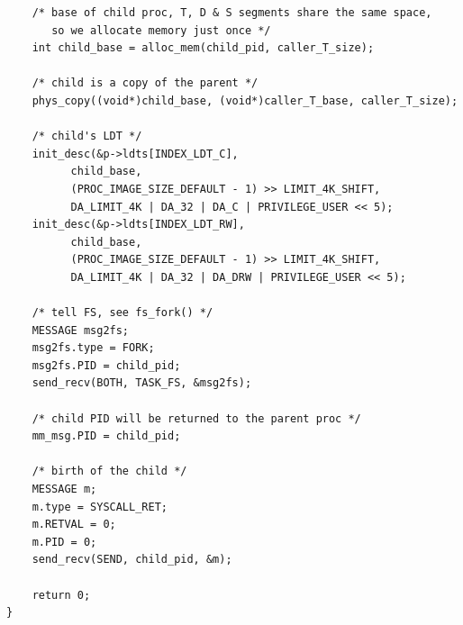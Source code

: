 \documentclass[UTF8,nofonts,cs4size]{ctexrep}
\begin{document}
\begin{lstlisting}
	/* base of child proc, T, D & S segments share the same space,
	   so we allocate memory just once */
	int child_base = alloc_mem(child_pid, caller_T_size);

	/* child is a copy of the parent */
	phys_copy((void*)child_base, (void*)caller_T_base, caller_T_size);

	/* child's LDT */
	init_desc(&p->ldts[INDEX_LDT_C],
		  child_base,
		  (PROC_IMAGE_SIZE_DEFAULT - 1) >> LIMIT_4K_SHIFT,
		  DA_LIMIT_4K | DA_32 | DA_C | PRIVILEGE_USER << 5);
	init_desc(&p->ldts[INDEX_LDT_RW],
		  child_base,
		  (PROC_IMAGE_SIZE_DEFAULT - 1) >> LIMIT_4K_SHIFT,
		  DA_LIMIT_4K | DA_32 | DA_DRW | PRIVILEGE_USER << 5);

	/* tell FS, see fs_fork() */
	MESSAGE msg2fs;
	msg2fs.type = FORK;
	msg2fs.PID = child_pid;
	send_recv(BOTH, TASK_FS, &msg2fs);

	/* child PID will be returned to the parent proc */
	mm_msg.PID = child_pid;

	/* birth of the child */
	MESSAGE m;
	m.type = SYSCALL_RET;
	m.RETVAL = 0;
	m.PID = 0;
	send_recv(SEND, child_pid, &m);

	return 0;
}

\end{lstlisting}
\end{document}
